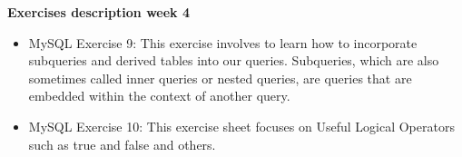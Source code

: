 \documentclass{article}
\begin{document}
\noindent \textbf{Exercises description week 4}

\begin{itemize}
\item MySQL Exercise 9: This exercise involves to learn how to incorporate subqueries and derived tables into our queries. Subqueries, which are also sometimes called inner queries or nested queries, are queries that are embedded within the context of another query. 

\item  MySQL Exercise 10: This exercise sheet focuses on Useful Logical Operators such as true and false and others. 


\end{itemize}
\end{document}
